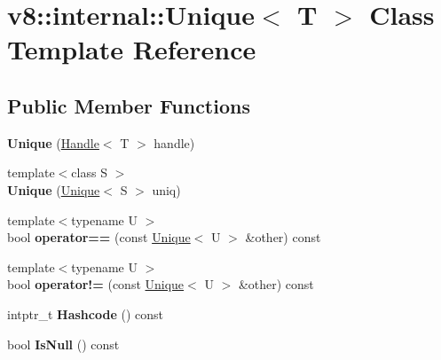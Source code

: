 \hypertarget{classv8_1_1internal_1_1_unique}{}\section{v8\+:\+:internal\+:\+:Unique$<$ T $>$ Class Template Reference}
\label{classv8_1_1internal_1_1_unique}
\subsection*{Public Member Functions}
\begin{DoxyCompactItemize}
\item 
{\bfseries Unique} (\hyperlink{classv8_1_1internal_1_1_handle}{Handle}$<$ T $>$ handle)\hypertarget{classv8_1_1internal_1_1_unique_a19dd7082a83a6592cbbcd4dcdcea5997}{}\label{classv8_1_1internal_1_1_unique_a19dd7082a83a6592cbbcd4dcdcea5997}

\item 
{\footnotesize template$<$class S $>$ }\\{\bfseries Unique} (\hyperlink{classv8_1_1internal_1_1_unique}{Unique}$<$ S $>$ uniq)\hypertarget{classv8_1_1internal_1_1_unique_ac6ad400572a9c753ce93fabcb3727b2d}{}\label{classv8_1_1internal_1_1_unique_ac6ad400572a9c753ce93fabcb3727b2d}

\item 
{\footnotesize template$<$typename U $>$ }\\bool {\bfseries operator==} (const \hyperlink{classv8_1_1internal_1_1_unique}{Unique}$<$ U $>$ \&other) const \hypertarget{classv8_1_1internal_1_1_unique_a6fbe0e7e075c198f2689cb9f9e32ca83}{}\label{classv8_1_1internal_1_1_unique_a6fbe0e7e075c198f2689cb9f9e32ca83}

\item 
{\footnotesize template$<$typename U $>$ }\\bool {\bfseries operator!=} (const \hyperlink{classv8_1_1internal_1_1_unique}{Unique}$<$ U $>$ \&other) const \hypertarget{classv8_1_1internal_1_1_unique_aba3dc4b06dad347059b220629c4d69ce}{}\label{classv8_1_1internal_1_1_unique_aba3dc4b06dad347059b220629c4d69ce}

\item 
intptr\+\_\+t {\bfseries Hashcode} () const \hypertarget{classv8_1_1internal_1_1_unique_ad9d0f6712417ff958f61d5e0b754bf91}{}\label{classv8_1_1internal_1_1_unique_ad9d0f6712417ff958f61d5e0b754bf91}

\item 
bool {\bfseries Is\+Null} () const \hypertarget{classv8_1_1internal_1_1_unique_a13a7885564a80b0a54c82457f4a4e779}{}\label{classv8_1_1internal_1_1_unique_a13a7885564a80b0a54c82457f4a4e779}


\end{DoxyCompactItemize}
